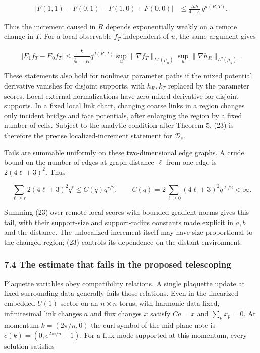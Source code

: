 \documentclass[11pt,a4paper]{article}
\begin{document}
\[\begin{aligned}
|F(1,1)-F(0,1)-F(1,0)+F(0,0)|
&\le\frac{tab}{4-\kappa}\,q^{d(R,T)}.
\end{aligned}\tag{23}\]

Thus the increment caused in \(R\) depends exponentially weakly on a
remote change in \(T\). For a local observable \(f_T\) independent of
\(u\), the same argument gives

\[|E_1f_T-E_0f_T|\le
\frac{t}{4-\kappa}q^{d(R,T)}
\sup_u\|\nabla f_T\|_{L^2(\mu_u)}
\sup_u\|\nabla h_R\|_{L^2(\mu_u)}.\tag{24}\]

These statements also hold for nonlinear parameter paths if the mixed
potential derivative vanishes for disjoint supports, with \(h_R,k_T\)
replaced by the parameter scores. Local external normalizations have
zero mixed derivative for disjoint supports. In a fixed local link
chart, changing coarse links in a region changes only incident bridge
and face potentials, after enlarging the region by a fixed number of
cells. Subject to the analytic condition after Theorem 5, (23) is
therefore the precise localized-increment statement for
\(\mathcal D_s\).

Tails are summable uniformly on these two-dimensional edge graphs. A
crude bound on the number of edges at graph distance \(\ell\) from one
edge is \(2(4\ell+3)^2\). Thus

\[\sum_{\ell\ge r}2(4\ell+3)^2q^\ell
\le C(q)q^{r/2},\qquad
C(q)=2\sum_{\ell\ge0}(4\ell+3)^2q^{\ell/2}<\infty.\tag{25}\]

Summing (23) over remote local scores with bounded gradient norms gives
this tail, with their support-size and support-radius constants made
explicit in \(a,b\) and the distance. The unlocalized increment itself
may have size proportional to the changed region; (23) controls its
dependence on the distant environment.

\hypertarget{the-estimate-that-fails-in-the-proposed-telescoping}{%
\subsubsection{7.4 The estimate that fails in the proposed
telescoping}\label{the-estimate-that-fails-in-the-proposed-telescoping}}

Plaquette variables obey compatibility relations. A single plaquette
update at fixed surrounding data generally fails those relations. Even
in the linearized embedded \(U(1)\) sector on an \(n\times n\) torus,
with harmonic data fixed, infinitesimal link changes \(a\) and flux
changes \(x\) satisfy \(Ca=x\) and \(\sum_p x_p=0\). At momentum
\(k=(2\pi/n,0)\) the curl symbol of the mid-plane note is
\(c(k)=(0,e^{2\pi i/n}-1)\). For a flux mode supported at this momentum,
every solution satisfies
\end{document}
